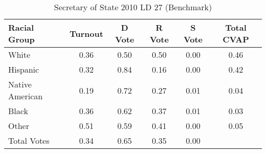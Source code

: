 \begin{table}[htb]
\begin{center}
\caption{Secretary of State 2010 LD 27 (Benchmark)}
\label{sos10_cvap_ld_27_benchmark}
\begin{tabular}{lccccc}
  \hline
Racial Group & Turnout & D Vote & R Vote & S Vote & Total CVAP \\ 
  \hline
White & 0.36 & 0.50 & 0.50 & 0.00 & 0.46 \\ 
  Hispanic & 0.32 & 0.84 & 0.16 & 0.00 & 0.42 \\ 
  Native American & 0.19 & 0.72 & 0.27 & 0.01 & 0.04 \\ 
  Black & 0.36 & 0.62 & 0.37 & 0.01 & 0.03 \\ 
  Other & 0.51 & 0.59 & 0.41 & 0.00 & 0.05 \\ 
  Total Votes & 0.34 & 0.65 & 0.35 & 0.00 &  \\ 
   \hline
\end{tabular}
\end{center}
\end{table}
